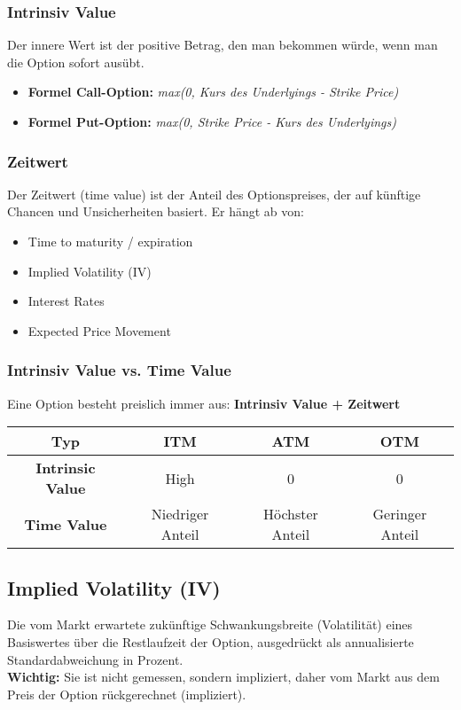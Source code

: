\subsubsection{Intrinsiv Value}
Der innere Wert ist der positive Betrag, den man bekommen würde, wenn man die Option sofort ausübt. 
\begin{itemize}
  \item \textbf{Formel Call-Option:} \textit{max(0, Kurs des Underlyings - Strike Price)}
  \item \textbf{Formel Put-Option:} \textit{max(0, Strike Price - Kurs des Underlyings)}
\end{itemize}

\subsubsection{Zeitwert}
Der Zeitwert (time value) ist der Anteil des Optionspreises, der auf künftige Chancen und Unsicherheiten basiert. Er hängt ab von:
\begin{itemize}
  \item Time to maturity / expiration
  \item Implied Volatility (IV)
  \item Interest Rates
  \item Expected Price Movement
\end{itemize}

\subsubsection{Intrinsiv Value vs. Time Value}
Eine Option besteht preislich immer aus: \textbf{Intrinsiv Value + Zeitwert}

\begin{table}[ht]
    \centering
    \begin{tabular}{cccc}
        \hline
        \textbf{Typ} & \textbf{ITM} & \textbf{ATM} & \textbf{OTM} \\
        \hline
        \textbf{Intrinsic Value} & High & 0 & 0 \\
        \hline
        \textbf{Time Value} & Niedriger Anteil & Höchster Anteil & Geringer Anteil \\
        \hline
    \end{tabular}
\end{table}

\subsection{Implied Volatility (IV)}
Die vom Markt erwartete zukünftige Schwankungsbreite (Volatilität) eines Basiswertes über die Restlaufzeit der Option, ausgedrückt als annualisierte Standardabweichung in Prozent. \\
\textbf{Wichtig:} Sie ist nicht gemessen, sondern impliziert, daher vom Markt aus dem Preis der Option rückgerechnet (impliziert).

